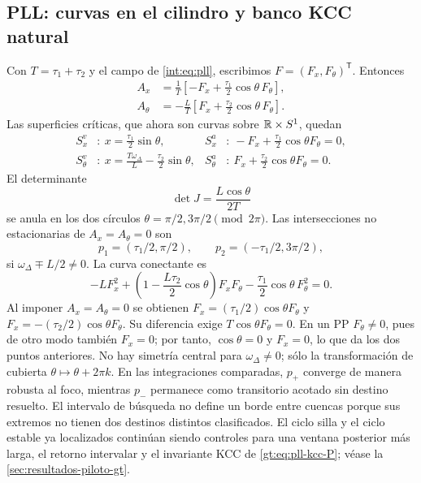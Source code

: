 \subsection{PLL: curvas en el cilindro y banco KCC natural}
\label{subsec:casegt-pll}

Con $T=\tau_1+\tau_2$ y el campo de \cref{int:eq:pll}, escribimos
$F=(F_x,F_\theta)^{\mathsf T}$. Entonces
\begin{align}
 A_x&=\frac1T\left[-F_x+\frac{\tau_1}{2}
 \cos\theta\,F_\theta\right],\nonumber\\
 A_\theta&=-\frac LT\left[F_x+\frac{\tau_2}{2}
 \cos\theta\,F_\theta\right].
 \label{casegt:eq:pll-A}
\end{align}
Las superficies críticas, que ahora son curvas sobre
$\mathbb{R}\times S^1$, quedan
\begin{align}
 S_x^v&:\ x=\frac{\tau_1}{2}\sin\theta,&
 S_x^a&:\ -F_x+\frac{\tau_1}{2}\cos\theta F_\theta=0,\nonumber\\
 S_\theta^v&:\ x=\frac{T\omega_\Delta}{L}
 -\frac{\tau_2}{2}\sin\theta,&
 S_\theta^a&:\ F_x+\frac{\tau_2}{2}\cos\theta F_\theta=0.
 \label{casegt:eq:pll-surfaces}
\end{align}
El determinante
\begin{equation}
 \det J=\frac{L\cos\theta}{2T}
 \label{casegt:eq:pll-det}
\end{equation}
se anula en los dos círculos
$\theta=\pi/2,3\pi/2\pmod{2\pi}$. Las intersecciones no estacionarias de
$A_x=A_\theta=0$ son
\begin{equation}
 p_1=(\tau_1/2,\pi/2),
 \qquad p_2=(-\tau_1/2,3\pi/2),
 \label{casegt:eq:pll-PP}
\end{equation}
si $\omega_\Delta\mp L/2\ne0$. La curva conectante es
\begin{equation}
 -LF_x^2+
 \left(1-\frac{L\tau_2}{2}\cos\theta\right)F_xF_\theta
 -\frac{\tau_1}{2}\cos\theta\,F_\theta^2=0.
 \label{casegt:eq:pll-CC}
\end{equation}
Al imponer $A_x=A_\theta=0$ se obtienen
$F_x=(\tau_1/2)\cos\theta F_\theta$ y
$F_x=-(\tau_2/2)\cos\theta F_\theta$. Su diferencia exige
$T\cos\theta F_\theta=0$. En un PP $F_\theta\ne0$, pues de otro modo
también $F_x=0$; por tanto, $\cos\theta=0$ y $F_x=0$, lo que da
los dos puntos anteriores. No hay simetría central para $\omega_\Delta\ne0$; sólo la transformación de
cubierta $\theta\mapsto\theta+2\pi k$.
En las integraciones comparadas, $p_+$ converge de manera
robusta al foco, mientras $p_-$ permanece como transitorio acotado
sin destino resuelto.
\ifHAFOBasinMaterial
El intervalo de búsqueda no define un borde entre cuencas porque sus
extremos no tienen dos destinos distintos clasificados.
\fi
El ciclo silla y el ciclo estable ya localizados continúan siendo controles para una ventana
posterior más larga, el retorno intervalar y el invariante KCC de
\eqref{gt:eq:pll-kcc-P}; véase la \cref{sec:resultados-piloto-gt}.

